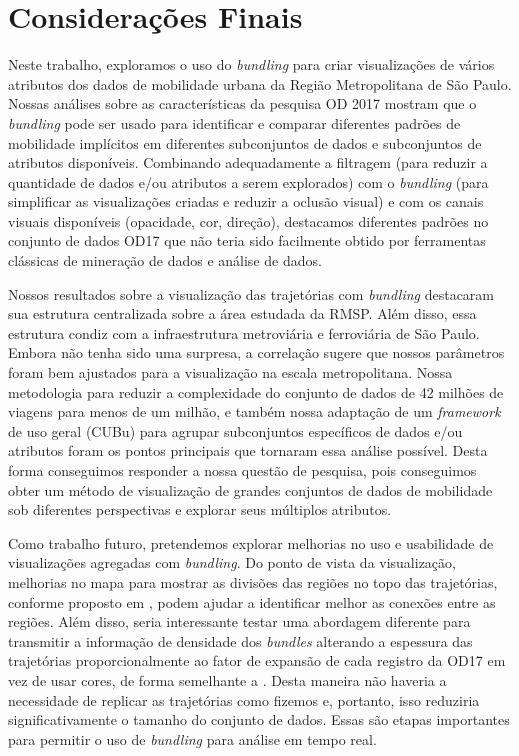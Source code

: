 \chapter{Considerações Finais}
\label{cap:plano-de-trabalho}

Neste trabalho, exploramos o uso do \emph{bundling} para criar
visualizações de vários atributos dos dados de mobilidade urbana da Região
Metropolitana de São Paulo. Nossas análises sobre as características da pesquisa
OD 2017 mostram que o \emph{bundling} pode ser usado para identificar e comparar
diferentes padrões de mobilidade implícitos em diferentes subconjuntos de dados
e subconjuntos de atributos disponíveis. Combinando adequadamente a filtragem
(para reduzir a quantidade de dados e/ou atributos a serem explorados) com o
\emph{bundling} (para simplificar as visualizações criadas e reduzir a oclusão
visual) e com os canais visuais disponíveis (opacidade, cor, direção),
destacamos diferentes padrões no conjunto de dados OD17 que não teria sido
facilmente obtido por ferramentas clássicas de mineração de dados e análise de
dados.

Nossos resultados sobre a visualização das trajetórias com \emph{bundling}
destacaram sua estrutura centralizada sobre a área estudada da RMSP. Além disso,
essa estrutura condiz com a infraestrutura metroviária e ferroviária de São
Paulo. Embora não tenha sido uma surpresa, a correlação sugere que nossos
parâmetros foram bem ajustados para a visualização na escala metropolitana.
Nossa metodologia para reduzir a complexidade do conjunto de dados de 42 milhões
de viagens para menos de um milhão, e também nossa adaptação de um
\emph{framework} de uso geral (CUBu) para agrupar subconjuntos específicos de
dados e/ou atributos foram os pontos principais que tornaram essa análise
possível. Desta forma conseguimos responder a nossa questão de pesquisa, pois
conseguimos obter um método de visualização de grandes conjuntos de dados de
mobilidade sob diferentes perspectivas e explorar seus múltiplos atributos.

Como trabalho futuro, pretendemos explorar melhorias no uso e usabilidade de
visualizações agregadas com \emph{bundling}. Do ponto de vista da visualização,
melhorias no mapa para mostrar as divisões das regiões no topo das trajetórias,
conforme proposto em \citet{Klein2014}, podem ajudar a identificar melhor as
conexões entre as regiões. Além disso, seria interessante testar uma abordagem
diferente para transmitir a informação de densidade dos \emph{bundles} alterando
a espessura das trajetórias proporcionalmente ao fator de expansão de cada
registro da OD17 em vez de usar cores, de forma semelhante a
\citet{lhuillier-fft:17}. Desta maneira não haveria a necessidade de replicar as
trajetórias como fizemos e, portanto, isso reduziria significativamente o
tamanho do conjunto de dados. Essas são etapas importantes para permitir o uso
de \emph{bundling} para análise em tempo real.

